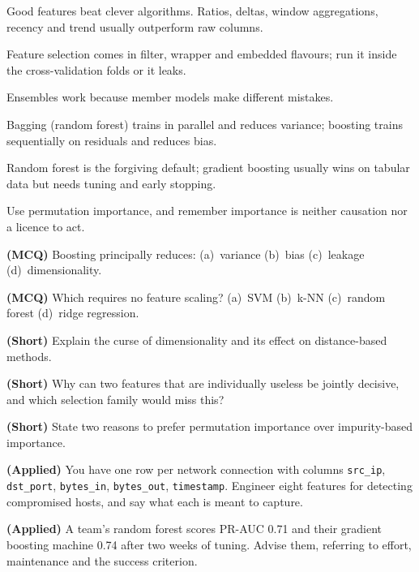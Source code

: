 \begin{chaptersummary}
\begin{tight}
  \item Good features beat clever algorithms. Ratios, deltas, window aggregations,
        recency and trend usually outperform raw columns.
  \item Feature selection comes in filter, wrapper and embedded flavours; run it
        inside the cross-validation folds or it leaks.
  \item Ensembles work because member models make different mistakes.
  \item Bagging (random forest) trains in parallel and reduces variance; boosting
        trains sequentially on residuals and reduces bias.
  \item Random forest is the forgiving default; gradient boosting usually wins on
        tabular data but needs tuning and early stopping.
  \item Use permutation importance, and remember importance is neither causation
        nor a licence to act.
\end{tight}
\end{chaptersummary}

\begin{reviewq}
  \item \textbf{(MCQ)} Boosting principally reduces: (a)~variance (b)~bias
        (c)~leakage (d)~dimensionality.
  \item \textbf{(MCQ)} Which requires no feature scaling? (a)~SVM (b)~k-NN
        (c)~random forest (d)~ridge regression.
  \item \textbf{(Short)} Explain the curse of dimensionality and its effect on
        distance-based methods.
  \item \textbf{(Short)} Why can two features that are individually useless be
        jointly decisive, and which selection family would miss this?
  \item \textbf{(Short)} State two reasons to prefer permutation importance over
        impurity-based importance.
  \item \textbf{(Applied)} You have one row per network connection with columns
        \texttt{src\_ip}, \texttt{dst\_port}, \texttt{bytes\_in},
        \texttt{bytes\_out}, \texttt{timestamp}. Engineer eight features for
        detecting compromised hosts, and say what each is meant to capture.
  \item \textbf{(Applied)} A team's random forest scores PR-AUC 0.71 and their
        gradient boosting machine 0.74 after two weeks of tuning. Advise them,
        referring to effort, maintenance and the success criterion.
\end{reviewq}
